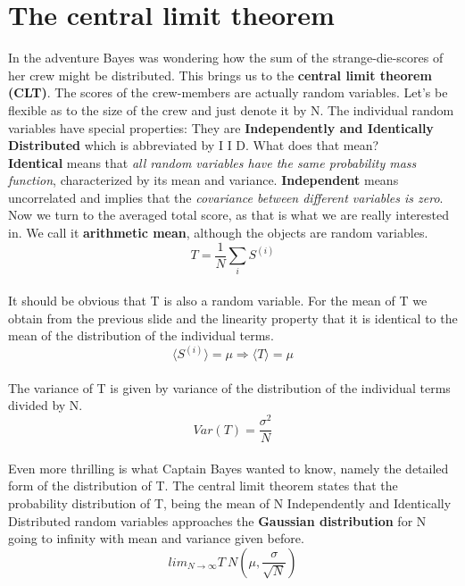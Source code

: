 \documentclass[12pt, a4paper]{scrartcl}
\begin{document}
\section*{The central limit theorem}
In the adventure Bayes was wondering how the sum of the strange-die-scores of her crew might be distributed. This brings us to the  \textbf{central limit theorem (CLT)}. 
The scores of the crew-members are actually random variables.
Let’s be flexible as to the size of the crew and just denote it by N.
The individual random variables have special properties: 
They are  \textbf{Independently and Identically Distributed} which is abbreviated by I I D.
What does that mean?\\
\textbf{Identical} means that \textit{all random variables have the same probability mass function}, characterized by its mean and variance.
 \textbf{Independent} means uncorrelated and implies that the \textit{covariance between different variables is zero}. 
Now we turn to the averaged total score, as that is what we are really interested in.
We call it  \textbf{arithmetic mean}, although the objects are random variables.
\begin{equation*}\boxed{T = \frac 1N \sum_iS^{(i)}
}\end{equation*}\\
It should be obvious that T is also a random variable. 
For the mean of T we obtain from the previous slide and the linearity property that it is identical to the mean of the distribution of the individual terms.
\begin{equation*}\boxed{\langle S^{(i)} \rangle = \mu \Rightarrow \langle T\rangle = \mu
}\end{equation*}\\
The variance of T is given by variance of the distribution of the individual terms divided by N.
\begin{equation*}\boxed{Var(T)=\frac{\sigma^2}{N}
}\end{equation*}\\
Even more thrilling is what Captain Bayes wanted to know, namely the detailed form of the distribution of T. The central limit theorem states that the probability distribution of T, being the mean of N Independently and Identically Distributed random variables approaches the  \textbf{Gaussian distribution} for N going to infinity with mean and variance given before.
\begin{equation*}\boxed{lim_{N\rightarrow \infty} T~ N\left(\mu, \frac{\sigma}{\sqrt{N}}\right)}\end{equation*}\\
\end{document}

